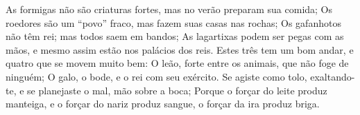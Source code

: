 {  As formigas não são criaturas fortes, mas no verão preparam sua comida;
  Os roedores
 são um “povo” fraco, mas fazem suas casas nas rochas;
  Os gafanhotos não têm rei; mas todos saem em bandos;
  As lagartixas podem ser pegas com as mãos, e mesmo assim estão nos palácios dos reis.
  Estes três tem um bom andar, e quatro que se movem muito bem:
  O leão, forte entre os animais, que não foge de ninguém;
  O galo, o bode, e o rei com seu exército.
  Se agiste como tolo, exaltando-te, e se planejaste o mal,
{} mão sobre a boca;
  Porque
{} o forçar do leite produz manteiga, e o forçar do nariz produz sangue,
{} o forçar da ira produz briga.
\par }

